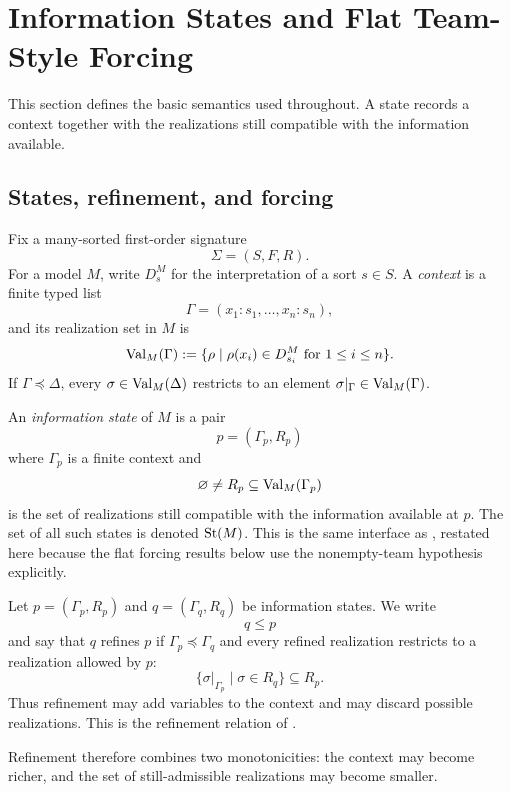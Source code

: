 \section{Information States and Flat Team-Style Forcing}\label{sec:information-states}

This section defines the basic semantics used throughout. A state records a context together with the realizations still compatible with the information available.

\subsection{States, refinement, and forcing}

Fix a many-sorted first-order signature
\[
\Sigma=(S,F,R).
\]
For a model $M$, write $D_s^M$ for the interpretation of a sort $s\in S$. A \emph{context} is a finite typed list
\[
\Gamma=(x_1:s_1,\dots,x_n:s_n),
\]
and its realization set in $M$ is
\[
\mathrm{Val}_M(\Gamma):=\{\rho\mid \rho(x_i)\in D_{s_i}^M\text{ for }1\le i\le n\}.
\]
If $\Gamma\preceq\Delta$, every $\sigma\in\mathrm{Val}_M(\Delta)$ restricts to an element $\sigma|_{\Gamma}\in\mathrm{Val}_M(\Gamma)$.

\begin{definition}\label{def:information-state}
An \emph{information state} of $M$ is a pair
\[
p=(\Gamma_p,R_p)
\]
where $\Gamma_p$ is a finite context and
\[
\varnothing\neq R_p\subseteq \mathrm{Val}_M(\Gamma_p)
\]
is the set of realizations still compatible with the information available at
$p$. The set of all such states is denoted $\mathrm{St}(M)$. This is the same
interface as \cite[Definition~3.1]{HomologicalVisibilityGluingObstructions2026},
restated here because the flat forcing results below use the nonempty-team
hypothesis explicitly.
\end{definition}

\begin{definition}[Refinement]\label{def:refinement}
Let $p=(\Gamma_p,R_p)$ and $q=(\Gamma_q,R_q)$ be information states. We write
\[
q\le p
\]
and say that $q$ refines $p$ if $\Gamma_p\preceq\Gamma_q$ and every refined
realization restricts to a realization allowed by $p$:
\[
\{\sigma|_{\Gamma_p}\mid \sigma\in R_q\}\subseteq R_p.
\]
Thus refinement may add variables to the context and may discard possible
realizations. This is the refinement relation of
\cite[Definition~3.2]{HomologicalVisibilityGluingObstructions2026}.
\end{definition}

Refinement therefore combines two monotonicities: the context may become richer, and the set of still-admissible realizations may become smaller.

